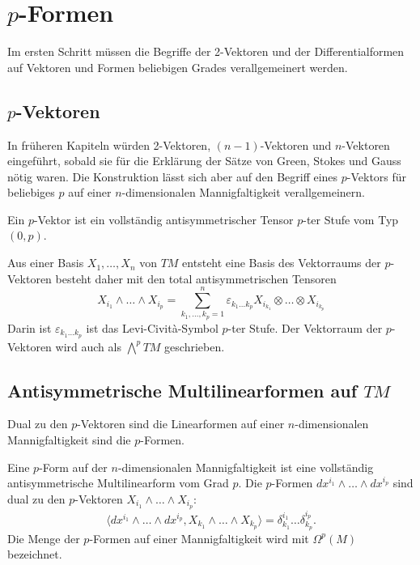 %
%
\section{$p$-Formen
\label{buch:pformen:section:pformen}}
Im ersten Schritt müssen die Begriffe der 2-Vektoren und der 
Differentialformen auf Vektoren und Formen beliebigen Grades
verallgemeinert werden.

%
%
\subsection{$p$-Vektoren}
In früheren Kapiteln würden 2-Vektoren, $(n-1)$-Vektoren und $n$-Vektoren
eingeführt, sobald sie für die Erklärung der Sätze von Green,
Stokes und Gauss nötig waren.
Die Konstruktion lässt sich aber auf den Begriff eines $p$-Vektors
für beliebiges $p$ auf einer $n$-dimensionalen Mannigfaltigkeit
verallgemeinern.

\begin{definition}
Ein $p$-Vektor ist ein vollständig antisymmetrischer Tensor
$p$-ter Stufe vom Typ $(0,p)$.
\end{definition}

Aus einer Basis $X_1,\dots,X_n$ von $TM$ entsteht eine Basis des
Vektorraums der $p$-Vektoren besteht daher mit den
total antisymmetrischen Tensoren
\[
X_{i_1}\wedge \dots\wedge X_{i_p}
=
\sum_{k_1,\dots,k_p=1}^{n}
\varepsilon_{k_1\dots k_p}
X_{i_{k_1}}\otimes\dots\otimes X_{i_{k_p}}
\]
Darin ist $\varepsilon_{k_1\dots k_p}$ ist das Levi-Cività-Symbol
$p$-ter Stufe.
Der Vektorraum der $p$-Vektoren wird auch als 
$\bigwedge^p TM$ geschrieben.

%
%
\subsection{Antisymmetrische Multilinearformen auf $TM$}
Dual zu den $p$-Vektoren sind die Linearformen auf einer $n$-dimensionalen
Mannigfaltigkeit sind die $p$-Formen.

\begin{definition}
Eine $p$-Form auf der $n$-dimensionalen Mannigfaltigkeit ist eine vollständig
antisymmetrische Multilinearform vom Grad $p$.
Die $p$-Formen $dx^{i_1}\wedge\dots\wedge dx^{i_p}$ sind dual zu den 
$p$-Vektoren $X_{i_1}\wedge\dots\wedge X_{i_p}$:
\[
\langle
dx^{i_1}\wedge\dots\wedge dx^{i_p},
X_{k_1}\wedge\dots\wedge X_{k_p}
\rangle
=
\delta^{i_1}_{k_1}
\dots
\delta^{i_p}_{k_p}.
\]
Die Menge der $p$-Formen auf einer Mannigfaltigkeit wird mit $\Omega^p(M)$
bezeichnet.
\end{definition}

